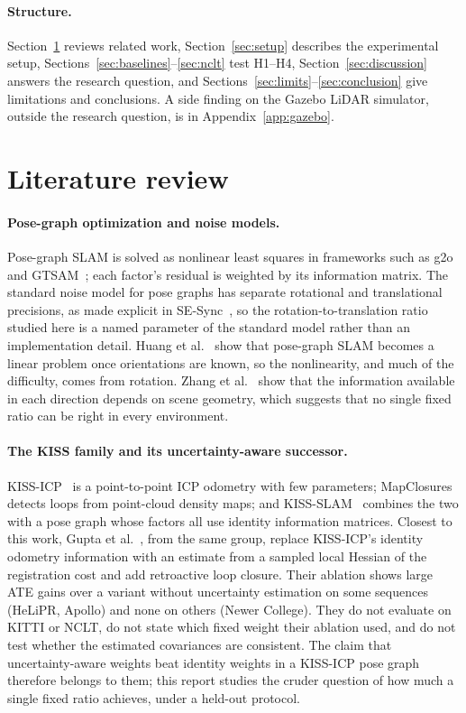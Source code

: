 \documentclass[11pt,a4paper]{article}
\begin{document}
\paragraph{Structure.} Section~\ref{sec:related} reviews related work, Section~\ref{sec:setup} describes the
experimental setup, Sections~\ref{sec:baselines}--\ref{sec:nclt} test H1--H4, Section~\ref{sec:discussion}
answers the research question, and Sections~\ref{sec:limits}--\ref{sec:conclusion} give limitations and
conclusions. A side finding on the Gazebo LiDAR simulator, outside the research question, is in
Appendix~\ref{app:gazebo}.

\section{Literature review}
\label{sec:related}

\paragraph{Pose-graph optimization and noise models.} Pose-graph SLAM is solved as nonlinear least squares in
frameworks such as g2o~\cite{g2o} and GTSAM~\cite{gtsam}; each factor's residual is weighted by its information
matrix. The standard noise model for pose graphs has separate rotational and translational precisions, as made
explicit in SE-Sync~\cite{sesync}, so the rotation-to-translation ratio studied here is a named parameter of the
standard model rather than an implementation detail. Huang et al.~\cite{huang2010} show that pose-graph SLAM
becomes a linear problem once orientations are known, so the nonlinearity, and much of the difficulty, comes from
rotation. Zhang et al.~\cite{degeneracy} show that the information available in each direction depends on scene
geometry, which suggests that no single fixed ratio can be right in every environment.

\paragraph{The KISS family and its uncertainty-aware successor.} KISS-ICP~\cite{kissicp} is a point-to-point ICP
odometry with few parameters; MapClosures~\cite{mapclosures} detects loops from point-cloud density maps; and
KISS-SLAM~\cite{kissslam} combines the two with a pose graph whose factors all use identity information
matrices. Closest to this work, Gupta et al.~\cite{retroslam}, from the same group, replace KISS-ICP's identity
odometry information with an estimate from a sampled local Hessian of the registration cost and add retroactive
loop closure. Their ablation shows large ATE gains over a variant without uncertainty estimation on some
sequences (HeLiPR, Apollo) and none on others (Newer College). They do not evaluate on KITTI or NCLT, do not state
which fixed weight their ablation used, and do not test whether the estimated covariances are consistent. The
claim that uncertainty-aware weights beat identity weights in a KISS-ICP pose graph therefore belongs to them;
this report studies the cruder question of how much a single fixed ratio achieves, under a held-out protocol.
\end{document}

